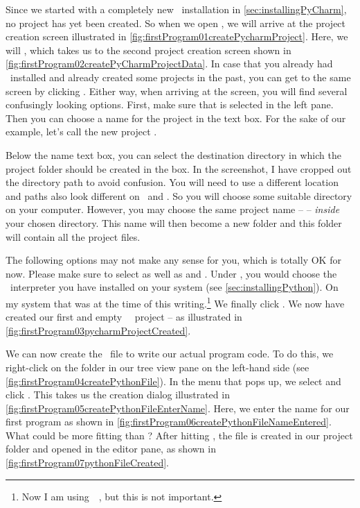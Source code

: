 Since we started with a completely new \pycharm\ installation in \cref{sec:installingPyCharm}, no project has yet been created.
So when we open \pycharm, we will arrive at the project creation screen illustrated in \cref{fig:firstProgram01createPycharmProject}.
Here, we will , which takes us to the second project creation screen shown in \cref{fig:firstProgram02createPyCharmProjectData}.
In case that you already had \pycharm\ installed and already created some projects in the past, you can get to the same screen by clicking .
Either way, when arriving at the screen, you will find several confusingly looking options.
First, make sure that  is selected in the left pane.
Then you can choose a name for the project in the  text box.
For the sake of our example, let's call the new project .

Below the name text box, you can select the destination directory in which the project folder should be created in the  box.
In the screenshot, I have cropped out the directory path to avoid confusion.
You will need to use a different location and paths also look different on \linux\ and \microsoftWindows.
So you will choose some suitable directory on your computer.
However, you may choose the same project name --  -- \emph{inside} your chosen directory.
This name will then become a new folder and this folder will contain all the project files.

The following options may not make any sense for you, which is totally OK for now.
Please make sure to select  as well as  and .
Under , you would choose the \python\ interpreter you have installed on your system (see \cref{sec:installingPython}).
On my system that was  at the time of this writing.\footnote{%
Now I am using~\python~\pythonVersion, but this is not important.}
We finally click .
We now have created our first and empty \pycharm\ \python\ project -- as illustrated in \cref{fig:firstProgram03pycharmProjectCreated}.

We can now create the \python\ file to write our actual program code.
To do this, we right-click on the folder  in our  tree view pane on the left-hand side (see \cref{fig:firstProgram04createPythonFile}).
In the menu that pops up, we select and click .
This takes us the  creation dialog illustrated in \cref{fig:firstProgram05createPythonFileEnterName}.
Here, we enter the name for our first program as shown in \cref{fig:firstProgram06createPythonFileNameEntered}.
What could be more fitting than ?
After hitting , the file is created in our project folder and opened in the editor pane, as shown in \cref{fig:firstProgram07pythonFileCreated}.

